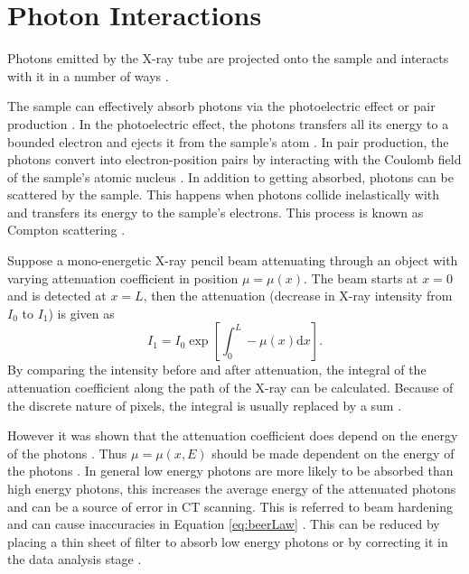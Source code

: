 \documentclass[12pt]{report}
\newcommand{\diff}{\mathrm{d}}
\begin{document}
\section{Photon Interactions}
Photons emitted by the X-ray tube are projected onto the sample and interacts with it in a number of ways \cite{cantatore2011introduction}.

The sample can effectively absorb photons via the photoelectric effect or pair production \cite{cantatore2011introduction}. In the photoelectric effect, the photons transfers all its energy to a bounded electron and ejects it from the sample's atom \cite{millikan1916direct}. In pair production, the photons convert into electron-position pairs by interacting with the Coulomb field of the sample's atomic nucleus \cite{hubbell2006electron}. In addition to getting absorbed, photons can be scattered by the sample. This happens when photons collide inelastically with and transfers its energy to the sample's electrons. This process is known as Compton scattering \cite{compton1923quantum}.

Suppose a mono-energetic X-ray pencil beam attenuating through an object with varying attenuation coefficient in position $\mu=\mu(x)$. The beam starts at $x=0$ and is detected at $x=L$, then the attenuation (decrease in X-ray intensity from $I_0$ to $I_1$) is given as \cite{cantatore2011introduction}
\begin{equation}
I_1 = I_0\exp\left[\int_0^L-\mu(x)\diff x\right].
\label{eq:beerLaw}
\end{equation}
By comparing the intensity before and after attenuation, the integral of the attenuation coefficient along the path of the X-ray can be calculated. Because of the discrete nature of pixels, the integral is usually replaced by a sum \cite{michael2001x}. 

However it was shown that the attenuation coefficient does depend on the energy of the photons \cite{elbakri2002statistical}. Thus $\mu=\mu(x,E)$ should be made dependent on the energy of the photons \cite{cantatore2011introduction}. In general low energy photons are more likely to be absorbed than high energy photons, this increases the average energy of the attenuated photons and can be a source of error in CT scanning. This is referred to beam hardening and can cause inaccuracies in Equation \eqref{eq:beerLaw} \cite{michael2001x}. This can be reduced by placing a thin sheet of filter to absorb low energy photons \cite{welkenhuyzen2009industrial} or by correcting it in the data analysis stage \cite{michael2001x}.
\end{document}
